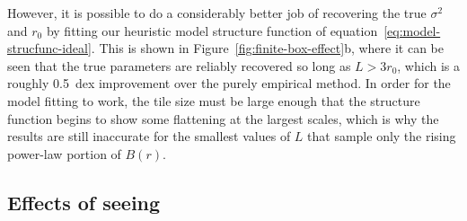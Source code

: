 \documentclass[fleqn,usenatbib, useAMS, a4paper]{mnras}
\begin{document}
However, it is possible to do a considerably better job
of recovering the true \(\sigma^2\) and \(r_0\) by fitting our
heuristic model structure function of equation~\eqref{eq:model-strucfunc-ideal}.
This is shown in Figure~\ref{fig:finite-box-effect}b, where it can be seen
that the true parameters are reliably recovered so long as \(L > 3 r_0\),
which is a roughly \SI{0.5}{dex} improvement over the purely empirical method.
In order for the model fitting to work, the tile size must be large enough
that the structure function begins to show some flattening at the largest scales,
which is why the results are still inaccurate for the smallest values of \(L\)
that sample only the rising power-law portion of \(B(r)\). 

\subsection{Effects of seeing}
\label{sec:effects-seeing-struc}
\end{document}
